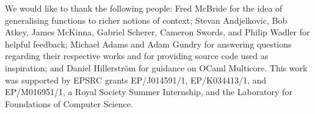 \documentclass{sigplanconf}
\begin{document}


\acks

We would like to thank the following people: Fred McBride for the idea
of generalising functions to richer notions of context;
%
Stevan Andjelkovic, Bob Atkey, James McKinna, Gabriel Scherer, Cameron Swords,
and Philip Wadler for helpful feedback;
%
Michael Adams and Adam Gundry for answering questions regarding their
respective works and for providing source code used as inspiration;
%
and Daniel Hillerstr\"om for guidance on OCaml Multicore.
%
This work was supported by EPSRC grants EP/J014591/1, EP/K034413/1,
and EP/M016951/1, a Royal Society Summer Internship, and the
Laboratory for Foundations of Computer Science.










%
\end{document}
